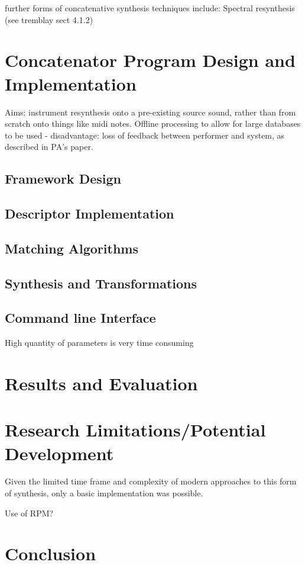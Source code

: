 \documentclass{scrartcl}
\begin{document}
    further forms of concatenative synthesis techniques include: Spectral resynthesis (see tremblay sect 4.1.2)
    
    \section*{Concatenator Program Design and Implementation}
    Aims:
    instrument resynthesis onto a pre-existing source sound, rather than from scratch onto things like midi notes.
    Offline processing to allow for large databases to be used - disadvantage: loss of feedback between performer and system, as described in PA's paper.
    \subsection*{Framework Design}
    \subsection*{Descriptor Implementation}
    \subsection*{Matching Algorithms}
    \subsection*{Synthesis and Transformations}
    \subsection*{Command line Interface}
    High quantity of parameters is very time consuming ~\parencite{Petrushin2007} 

    \section*{Results and Evaluation}

    \section*{Research Limitations/Potential Development}
    Given the limited time frame and complexity of modern approaches to this
    form of synthesis, only a basic implementation was possible.

    Use of RPM?~\parencite[p.82]{Lindemann2007}

    \section*{Conclusion}

    \printbibliography
\end{document}
